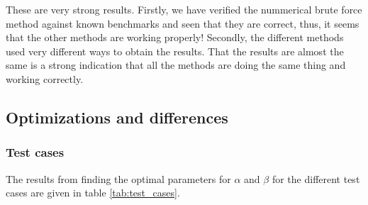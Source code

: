 These are very strong results. 
Firstly, we have verified the nummerical brute force method against known benchmarks and seen that they are correct,
thus, it seems that the other methods are working properly!
Secondly, the different methods used very different ways to obtain the results. 
That the results are almost the same is a strong indication that all the methods are doing the same thing and working correctly. 

\subsection{Optimizations and differences} \label{sec:res_opt_and_diff}

\subsubsection{Test cases}

The results from finding the optimal parameters for $\alpha$ and $\beta$ for the different test cases are given in table \ref{tab:test_cases}.

